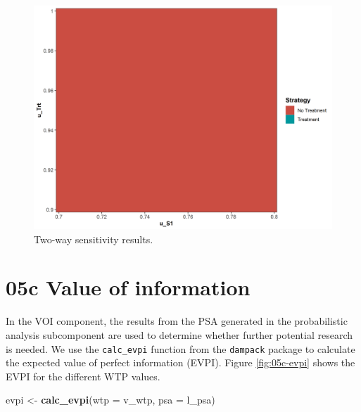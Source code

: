 \documentclass[]{book}
\newenvironment{Shaded}{\begin{snugshade}}{\end{snugshade}}
\newcommand{\DataTypeTok}[1]{\textcolor[rgb]{0.13,0.29,0.53}{#1}}
\newcommand{\KeywordTok}[1]{\textcolor[rgb]{0.13,0.29,0.53}{\textbf{#1}}}
\newcommand{\NormalTok}[1]{#1}
\newcommand{\StringTok}[1]{\textcolor[rgb]{0.31,0.60,0.02}{#1}}
\begin{document}
\begin{figure}

{\centering \includegraphics[width=1\linewidth]{../figs/05b_twsa_uS1_uTrt_nmb} 

}

\caption{Two-way sensitivity results.}\label{fig:05b-twsa-uS1-uTrt-nmb}
\end{figure}

\hypertarget{voi}{%
\section{05c Value of information}\label{voi}}

In the VOI component, the results from the PSA generated in the probabilistic analysis subcomponent are used to determine whether further potential research is needed. We use the \texttt{calc\_evpi} function from the \texttt{dampack} package to calculate the expected value of perfect information (EVPI). Figure \ref{fig:05c-evpi} shows the EVPI for the different WTP values.

\begin{Shaded}
\begin{Highlighting}[]
\NormalTok{evpi <-}\StringTok{ }\KeywordTok{calc_evpi}\NormalTok{(}\DataTypeTok{wtp =}\NormalTok{ v_wtp, }\DataTypeTok{psa =}\NormalTok{ l_psa)}
\end{Highlighting}
\end{Shaded}
\end{document}
